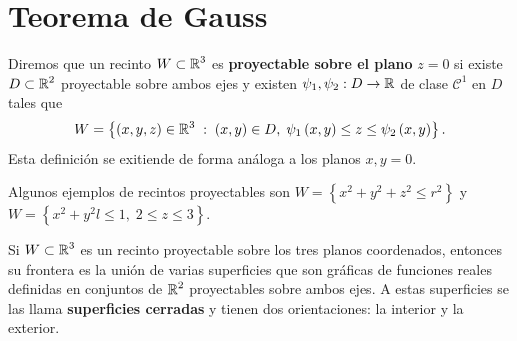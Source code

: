\section{Teorema de Gauss}
\begin{definition}
Diremos que un recinto $\displaystyle W \subset \mathbb{R}^{3} $ es \textbf{proyectable sobre el plano} $\displaystyle z = 0 $ si existe $\displaystyle D \subset \mathbb{R}^{2} $ proyectable sobre ambos ejes y existen $\displaystyle \psi_{1}, \psi_{2} : D \to \mathbb{R} $ de clase $\displaystyle \mathcal{C}^{1} $ en $\displaystyle D $ tales que 
\[W = \left\{ \left(x,y,z\right) \in \mathbb{R}^{3} \; : \; \left(x,y\right)\in D, \; \psi_{1}\left(x,y\right)\leq z \leq \psi_{2}\left(x,y\right)\right\}  .\]
Esta definición se exitiende de forma análoga a los planos $\displaystyle x,y = 0 $. 
\end{definition}
\begin{eg}
	Algunos ejemplos de recintos proyectables son $\displaystyle W = \left\{ x^{2}+y^{2} +z^{2}\leq r^{2}\right\}  $ y $\displaystyle W = \left\{ x^{2}+y^{2}l \leq 1, \; 2 \leq z \leq 3\right\}  $. 
\end{eg}
\begin{prop}
Si $\displaystyle W \subset \mathbb{R}^{3} $ es un recinto proyectable sobre los tres planos coordenados, entonces su frontera es la unión de varias superficies que son gráficas de funciones reales definidas en conjuntos de $\displaystyle \mathbb{R}^{2} $ proyectables sobre ambos ejes. A estas superficies se las llama \textbf{superficies cerradas} y tienen dos orientaciones: la interior y la exterior.
\end{prop}

